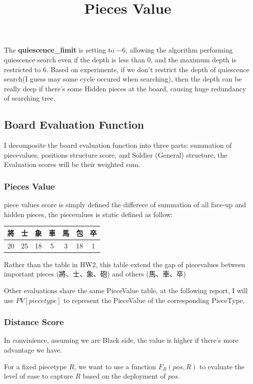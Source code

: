 \documentclass[a4paper, 12pt]{article}  %
\begin{document}
The \textbf{quiescence\_limit} is setting to $-6$, allowing the algorithm performing quiescence search even if the depth is less than $0$, and the maximum depth is restricted to $6$. Based on experiments, if we don't restrict the depth of quiescence search(I guess may some cycle occured when searching), then the depth can be really deep if there's some Hidden pieces at the board, causing huge redundancy of searching tree.

\subsection{Board Evaluation Function}
I decomposite the board evaluation function into three parts: summation of piecevalues, positions structure score, and Soldier (General) structure, the Evaluation scores will be their weighted sum.
\subsubsection{Pieces Value}
piece values score is simply defined the differece of summation of all face-up and hidden pieces, the piecevalues is static defined as follow:

\begin{table}[!h]
  \centering
  \begin{tabular}{|c|c|c|c|c|c|c|}
    將 & 士 & 象 & 車 & 馬 & 包 & 卒\\
    \hline
    20 & 25 & 18 & 5 & 3 & 18 & 1
  \end{tabular}

  \title{Pieces Value}
\end{table}


Rather than the table in HW2, this table extend the gap of piecevalues between important pieces (將、士、象、砲) and others (馬、車、卒)

Other evaluations share the same PieceValue table, at the following report, I will use $PV[piecetype]$ to represent the PieceValue of the corresponding PieceType.

\subsubsection{Distance Score}
In convinience, assuming we are Black side, the value is higher if there's more advantage we have.

For a fixed piecetype $R$, we want to use a function $F_B(pos, R)$ to evaluate the level of ease to capture $R$ based on the deployment of $pos$.
\end{document}

